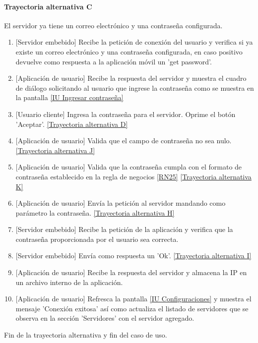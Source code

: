 \paragraph{Trayectoria alternativa C} \label{SUB-U-CU1.4:TC}
    El servidor ya tiene un correo electrónico y una contraseña configurada.
    \begin{enumerate}[label=C\arabic*.]
		\item {[Servidor embebido]} Recibe la petición de conexión del usuario y verifica si ya existe un correo electrónico y una contraseña configurada, en caso positivo devuelve como respuesta a la aplicación móvil un 'get password'.
		\item {[Aplicación de usuario]} Recibe la respuesta del servidor y muestra el cuadro de diálogo solicitando al usuario que ingrese la contraseña como se muestra en la pantalla \hyperref[fig:contrasena]{[IU Ingresar contraseña]}
		\item {[Usuario cliente]} Ingresa la contraseña para el servidor. Oprime el botón 'Aceptar'. \hyperref[SUB-U-CU1.4:TD]{[Trayectoria alternativa D]}
		\item {[Aplicación de usuario]} Valida que el campo de contraseña no sea nulo. \hyperref[SUB-U-CU1.4:TJ]{[Trayectoria alternativa J]}
		\item {[Aplicación de usuario]} Valida que la contraseña cumpla con el formato de contraseña establecido en la regla de negocios \ref{RN25} \hyperref[SUB-U-CU1.4:TK]{[Trayectoria alternativa K]}
		\item {[Aplicación de usuario]} Envía la petición al servidor mandando como parámetro la contraseña. \hyperref[SUB-U-CU1.4:TH]{[Trayectoria alternativa H]}
		\item {[Servidor embebido]} Recibe la petición de la aplicación y verifica que la contraseña proporcionada por el usuario sea correcta.
		\item {[Servidor embebido]} Envía como respuesta un 'Ok'. \hyperref[SUB-U-CU1.4:TI]{[Trayectoria alternativa I]}
		\item {[Aplicación de usuario]} Recibe la respuesta del servidor y almacena la IP en un archivo interno de la aplicación.
		\item {[Aplicación de usuario]} Refresca la pantalla \hyperref[fig:Configuraciones]{[IU Configuraciones]} y muestra el mensaje 'Conexión exitosa' así como actualiza el listado de servidores que se observa en la sección 'Servidores' con el servidor agregado. 
	\end{enumerate}
	Fin de la trayectoria alternativa y fin del caso de uso.
	
